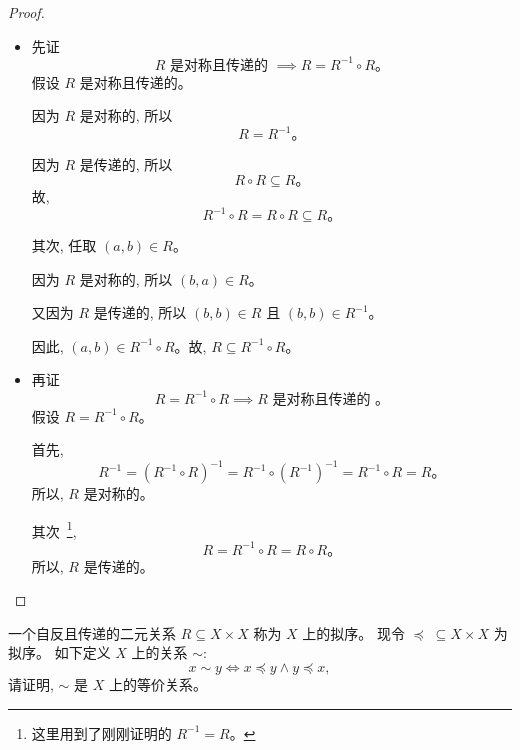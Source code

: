 \documentclass[a4paper, justified]{tufte-handout}
\begin{document}
\begin{proof}
  \begin{itemize}
    \item 先证
      \[
        R \text{ 是对称且传递的 } \implies R = R^{-1} \circ R\text{。}
      \]
      假设 $R$ 是对称且传递的。

      因为 $R$ 是对称的, 所以
      \[
        R = R^{-1}\text{。}
      \]

      因为 $R$ 是传递的, 所以
      \[
        R \circ R \subseteq R\text{。}
      \]
      故,
      \[
        R^{-1} \circ R = R \circ R \subseteq R\text{。}
      \]

      其次, 任取 $(a, b) \in R$。

      因为 $R$ 是对称的, 所以 $(b, a) \in R$。

      又因为 $R$ 是传递的, 所以 $(b, b) \in R$ 且 $(b, b) \in R^{-1}$。

      因此, $(a, b) \in R^{-1} \circ R$。故, $R \subseteq R^{-1} \circ R$。
    \item 再证
      \[
        R = R^{-1} \circ R \implies R \text{ 是对称且传递的 }\text{。}
      \]
      假设 $R = R^{-1} \circ R$。

      首先,
      \[
        R^{-1} = (R^{-1} \circ R)^{-1} =
          R^{-1} \circ (R^{-1})^{-1} =
          R^{-1} \circ R = R\text{。}
      \]
      所以, $R$ 是对称的。

      其次~\footnote{这里用到了刚刚证明的 $R^{-1} = R$。},
      \[
        R = R^{-1} \circ R = R \circ R\text{。}
      \]
      所以, $R$ 是传递的。
  \end{itemize}
\end{proof}

\newpage
\begin{problem}[等价关系]
  一个自反且传递的二元关系 $R \subseteq X \times X$
  称为 $X$ 上的拟序。
  现令 $\preceq\; \subseteq X \times X$ 为拟序。
  如下定义 $X$ 上的关系 $\sim$:
  \[
    x \sim y \iff x \preceq y \land y \preceq x,
  \]
  请证明, $\sim$ 是 $X$ 上的等价关系。
\end{problem}
\end{document}
